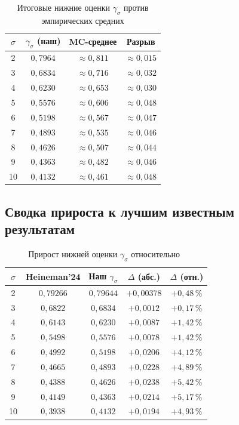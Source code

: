 \begin{table}[h!]
\caption{Итоговые нижние оценки $\gamma_\sigma$ против эмпирических средних}
\centering
\begin{tabular}{|c|c|c|c|}
\hline
$\sigma$ & $\gamma_\sigma$ (наш) & MC-среднее & Разрыв \\
\hline
2  & $0{,}7964$ & $\approx 0{,}811$ & $\approx 0{,}015$ \\
3  & $0{,}6834$ & $\approx 0{,}716$ & $\approx 0{,}032$ \\
4  & $0{,}6230$ & $\approx 0{,}653$ & $\approx 0{,}030$ \\
5  & $0{,}5576$ & $\approx 0{,}606$ & $\approx 0{,}048$ \\
6  & $0{,}5198$ & $\approx 0{,}567$ & $\approx 0{,}047$ \\
7  & $0{,}4893$ & $\approx 0{,}535$ & $\approx 0{,}046$ \\
8  & $0{,}4626$ & $\approx 0{,}507$ & $\approx 0{,}044$ \\
9  & $0{,}4363$ & $\approx 0{,}482$ & $\approx 0{,}046$ \\
10 & $0{,}4132$ & $\approx 0{,}461$ & $\approx 0{,}048$ \\
\hline
\end{tabular}
\end{table}

\subsection*{Сводка прироста к лучшим известным результатам}

\begin{table}[h!]
\caption{Прирост нижней оценки $\gamma_\sigma$ относительно~\cite{heineman2024}}
\centering
\begin{tabular}{|c|c|c|c|c|}
\hline
$\sigma$ & Heineman'24 & Наш $\gamma_\sigma$ & $\Delta$ (абс.) & $\Delta$ (отн.) \\
\hline
2  & $0{,}79266$ & $0{,}79644$ & $+0{,}00378$ & $+0{,}48\,\%$ \\
3  & $0{,}6822$  & $0{,}6834$  & $+0{,}0012$  & $+0{,}17\,\%$ \\
4  & $0{,}6143$  & $0{,}6230$  & $+0{,}0087$  & $+1{,}42\,\%$ \\
5  & $0{,}5498$  & $0{,}5576$  & $+0{,}0078$  & $+1{,}42\,\%$ \\
6  & $0{,}4992$  & $0{,}5198$  & $+0{,}0206$  & $+4{,}12\,\%$ \\
7  & $0{,}4665$  & $0{,}4893$  & $+0{,}0228$  & $+4{,}89\,\%$ \\
8  & $0{,}4388$  & $0{,}4626$  & $+0{,}0238$  & $+5{,}42\,\%$ \\
9  & $0{,}4149$  & $0{,}4363$  & $+0{,}0214$  & $+5{,}17\,\%$ \\
10 & $0{,}3938$  & $0{,}4132$  & $+0{,}0194$  & $+4{,}93\,\%$ \\
\hline
\end{tabular}
\end{table}
